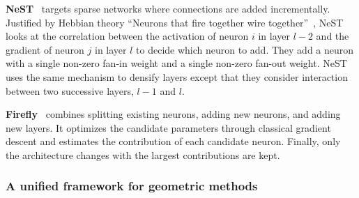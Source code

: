 \textbf{NeST}~\citep{daiNeSTNeuralNetwork2019} targets sparse networks where connections are added incrementally. Justified by Hebbian theory ``Neurons that fire together wire together''~\citep{lowel_1992}, NeST looks at the correlation between the activation of neuron $i$ in layer $l-2$ and the gradient of neuron $j$ in layer $l$ to decide which neuron to add. They add a neuron with a single non-zero fan-in weight and a single non-zero fan-out weight.
NeST uses the same mechanism to densify layers except that they consider interaction between two successive layers, \eg{} $l-1$ and $l$.

\textbf{Firefly}~\citep{wu_firefly_2020} combines splitting existing neurons, adding new neurons, and adding new layers. It optimizes the candidate parameters through classical gradient descent and estimates the contribution of each candidate neuron. Finally, only the architecture changes with the largest contributions are kept.


\subsubsection{A unified framework for geometric methods}
\label{sec:unified}

